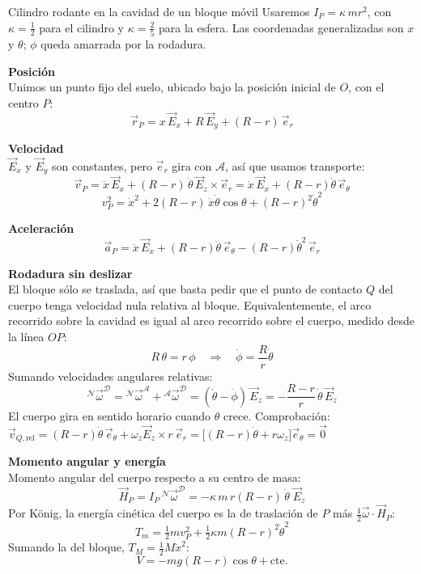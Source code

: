 \begin{solucion}{Cilindro rodante en la cavidad de un bloque móvil}
Usaremos $I_P=\kappa\,m r^2$, con $\kappa=\tfrac12$ para el cilindro y $\kappa=\tfrac25$ para la esfera. Las coordenadas generalizadas son $x$ y $\theta$; $\phi$ queda amarrada por la rodadura.
 
\textbf{Posición}\\
Unimos un punto fijo del suelo, ubicado bajo la posición inicial de $O$, con el centro $P$:
$$\vec{r}_P = x\,\vec{E}_x + R\,\vec{E}_y + (R-r)\,\vec{e}_r$$
 
\textbf{Velocidad}\\
$\vec{E}_x$ y $\vec{E}_y$ son constantes, pero $\vec{e}_r$ gira con $\mathcal{A}$, así que usamos transporte:
$$\vec{v}_P = \dot x\,\vec{E}_x + (R-r)\,\dot\theta\,\vec{E}_z\times\vec{e}_r = \dot x\,\vec{E}_x + (R-r)\dot\theta\,\vec{e}_\theta$$
$$v_P^2 = \dot x^2 + 2(R-r)\,\dot x\dot\theta\cos\theta + (R-r)^2\dot\theta^2$$
 
\textbf{Aceleración}\\
$$\vec{a}_P = \ddot x\,\vec{E}_x + (R-r)\ddot\theta\,\vec{e}_\theta - (R-r)\dot\theta^2\,\vec{e}_r$$
 
\textbf{Rodadura sin deslizar}\\
El bloque sólo se traslada, así que basta pedir que el punto de contacto $Q$ del cuerpo tenga velocidad nula relativa al bloque. Equivalentemente, el arco recorrido sobre la cavidad es igual al arco recorrido sobre el cuerpo, medido desde la línea $OP$:
$$R\,\theta = r\,\phi \quad\Rightarrow\quad \dot\phi = \frac{R}{r}\dot\theta$$
Sumando velocidades angulares relativas:
$${}^{\mathcal N}\vec{\omega}^{\mathcal D} = {}^{\mathcal N}\vec{\omega}^{\mathcal A}+{}^{\mathcal A}\vec{\omega}^{\mathcal D} = (\dot\theta-\dot\phi)\,\vec{E}_z = -\frac{R-r}{r}\,\dot\theta\,\vec{E}_z$$
El cuerpo gira en sentido horario cuando $\theta$ crece. Comprobación: $\vec{v}_{Q,\text{rel}} = (R-r)\dot\theta\,\vec{e}_\theta + \omega_z\vec{E}_z\times r\,\vec{e}_r = \big[(R-r)\dot\theta + r\omega_z\big]\vec{e}_\theta = \vec{0}$ \checkmark
 
\textbf{Momento angular y energía}\\
Momento angular del cuerpo respecto a su centro de masa:
$$\vec{H}_P = I_P\,{}^{\mathcal N}\vec{\omega}^{\mathcal D} = -\kappa\, m\, r (R-r)\,\dot\theta\;\vec{E}_z$$
Por König, la energía cinética del cuerpo es la de traslación de $P$ más $\tfrac12\vec{\omega}\cdot\vec{H}_P$:
$$T_m = \tfrac12 m v_P^2 + \tfrac12\kappa m (R-r)^2\dot\theta^2$$
Sumando la del bloque, $T_M=\tfrac12 M\dot x^2$:
$$V = -m g (R-r)\cos\theta + \text{cte.}$$
 

\end{solucion}
